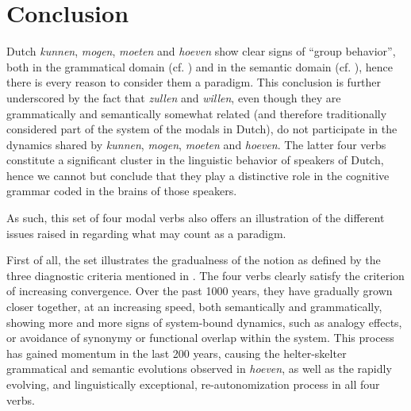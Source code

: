 \documentclass[output=paper]{langsci/langscibook}
\begin{document}
\section{Conclusion} \label{nuyts:6}

Dutch {\textit{kunnen}}{,} {\textit{mogen}}{,} {\textit{moeten}}{ and} {\textit{hoeven}}{ show clear signs of “group behavior”, both in the grammatical domain (cf. ) and in the semantic domain (cf. ), hence there is every reason to consider them a paradigm. This conclusion is further underscored by the fact that} {\textit{zullen}}{ and} {\textit{willen}}{, even though they are grammatically and semantically somewhat related (and therefore traditionally considered part of the system of the modals in Dutch), do not participate in the dynamics shared by} {\textit{kunnen}}{,} {\textit{mogen}}{,} {\textit{moeten}}{ and} {\textit{hoeven}}{. The latter four verbs constitute a significant cluster in the linguistic behavior of speakers of Dutch, hence we cannot but conclude that they play a distinctive role in the cognitive grammar coded in the brains of those speakers.}

As such, this set of four modal verbs also offers an illustration of the different issues raised in  regarding what may count as a paradigm.

First of all, the set illustrates the gradualness of the notion as defined by the three diagnostic criteria mentioned in . The four verbs clearly satisfy the criterion of increasing convergence. Over the past 1000 years, they have gradually grown closer together, at an increasing speed, both semantically and grammatically, showing more and more signs of system-bound dynamics, such as analogy effects, or avoidance of synonymy or functional overlap within the system. This process has gained momentum in the last 200 years, causing the helter-skelter grammatical and semantic evolutions observed in \textit{hoeven}, as well as the rapidly evolving, and linguistically exceptional, re-autonomization process in all four verbs.
\end{document}
